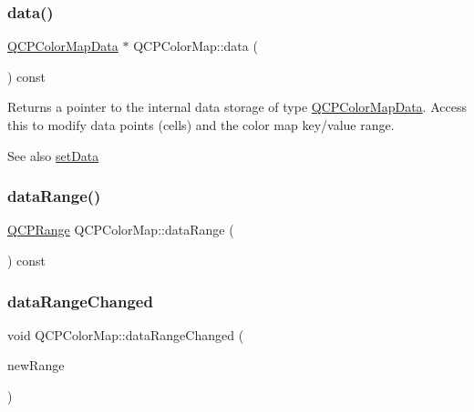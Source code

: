 \mbox{\label{class_q_c_p_color_map_a047d7eb3ae657f93f2f39b5e68b79451}} 
\subsubsection{\texorpdfstring{data()}{data()}}
{\footnotesize\ttfamily \mbox{\hyperlink{class_q_c_p_color_map_data}{Q\+C\+P\+Color\+Map\+Data}} $\ast$ Q\+C\+P\+Color\+Map\+::data (\begin{DoxyParamCaption}{ }\end{DoxyParamCaption}) const\hspace{0.3cm}{\ttfamily [inline]}}

Returns a pointer to the internal data storage of type \mbox{\hyperlink{class_q_c_p_color_map_data}{Q\+C\+P\+Color\+Map\+Data}}. Access this to modify data points (cells) and the color map key/value range.

\begin{DoxySeeAlso}{See also}
\mbox{\hyperlink{class_q_c_p_color_map_a5a23e133a20c4ccad35fd32e6c0f9809}{set\+Data}} 
\end{DoxySeeAlso}
\mbox{\label{class_q_c_p_color_map_ae478f0a5a016420d66c70cc33d6cda1d}} 
\subsubsection{\texorpdfstring{dataRange()}{dataRange()}}
{\footnotesize\ttfamily \mbox{\hyperlink{class_q_c_p_range}{Q\+C\+P\+Range}} Q\+C\+P\+Color\+Map\+::data\+Range (\begin{DoxyParamCaption}{ }\end{DoxyParamCaption}) const\hspace{0.3cm}{\ttfamily [inline]}}

\mbox{\label{class_q_c_p_color_map_a83ae5be3903da493f732e1a5c14fd807}} 
\subsubsection{\texorpdfstring{dataRangeChanged}{dataRangeChanged}}
{\footnotesize\ttfamily void Q\+C\+P\+Color\+Map\+::data\+Range\+Changed (\begin{DoxyParamCaption}\item[{const \mbox{\hyperlink{class_q_c_p_range}{Q\+C\+P\+Range}} \&}]{new\+Range }\end{DoxyParamCaption})\hspace{0.3cm}{\ttfamily [signal]}}

